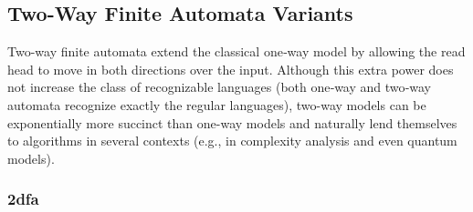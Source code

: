 \subsection{Two-Way Finite Automata Variants}
\label{subsec:two-way-variants}

Two-way finite automata extend the classical one‐way model by allowing the read head to move in both directions over the input. Although this extra power does not increase the class of recognizable languages (both one‐way and two‐way automata recognize exactly the regular languages), two-way models can be exponentially more succinct than one-way models \cite{sakoda1978nfas, kozen1997automata} and naturally lend themselves to algorithms in several contexts (e.g., in complexity analysis and even quantum models).


\subsubsection{\acrfull{2dfa}}
\label{subsubsec:2dfa}


